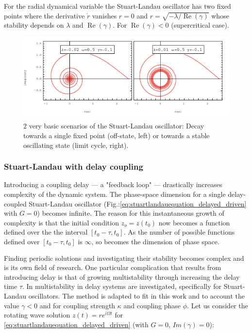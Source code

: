 	For the radial dynamical variable the Stuart-Landau oscillator has two fixed points where the derivative $\dot{r}$ vanishes $r = 0$ and $r = \sqrt{-\lambda /\operatorname{Re}(\gamma)}$ whose stability depends on $\lambda$ and $\operatorname{Re}(\gamma)$. For $\operatorname{Re}(\gamma) < 0 $ (supercritical case).


\begin{figure}
	\centering
	\includegraphics[width=0.99\linewidth]{pics/stuart_landau_complex_Focus_LC}
	\caption{$2$ very basic scenarios of the Stuart-Landau oscillator: Decay towards a single fixed point (off-state, left) or towards a stable oscillating state (limit cycle, right).}
	\label{fig:stuart_spiral}
\end{figure}


\subsubsection{Stuart-Landau with delay coupling}

	Introducing a coupling delay --- a "feedback loop" --- drastically increases complexity of the dynamic system. The phase-space dimension for a single delay-coupled Stuart-Landau oscillator (Fig.:\ref{eq:stuartlandauequation_delayed_driven} with $G=0$) becomes infinite. The reason for this instantaneous growth of complexity is that the initial condition $z_o = z(t_0)$ now becomes a function defined over the the interval $[t_0 - \tau,t_0]$. As the number of possible functions defined over $[t_0-\tau,t_0]$ is $\infty$, so becomes the dimension of phase space.  
	
	Finding periodic solutions and investigating their stability becomes complex and is its own field of research. One particular complication that results from introducing delay is that of growing multistability through increasing the delay time $\tau$.
	In \cite{YAN09, CHO09} multistability in delay systems are investigated, specifically for Stuart-Landau oscillators. The method is adapted to fit in this work and to account the value $\gamma < 0$ and for coupling strength $\kappa$ and coupling phase $\phi$. Let us consider the rotating wave solution $z(t) = r e^{i \Omega t}$ for \ref{eq:stuartlandauequation_delayed_driven} (with $G=0$, $Im(\gamma)=0$):

